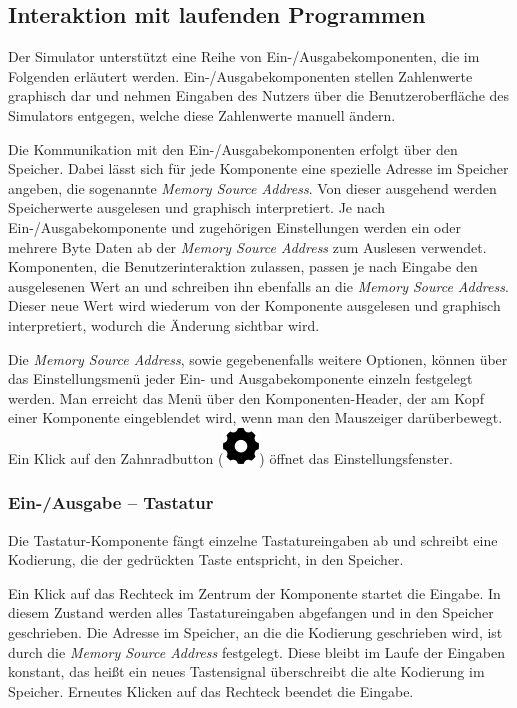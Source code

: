 \subsection{Interaktion mit laufenden Programmen}

Der Simulator unterstützt eine Reihe von Ein-/Ausgabekomponenten, die im
Folgenden erläutert werden. Ein-/Ausgabekomponenten stellen Zahlenwerte
graphisch dar und nehmen Eingaben des Nutzers über die Benutzeroberfläche des
Simulators entgegen, welche diese Zahlenwerte manuell ändern.

Die Kommunikation mit den Ein-/Ausgabekomponenten erfolgt über den Speicher.
Dabei lässt sich für jede Komponente eine spezielle Adresse im Speicher angeben,
die sogenannte \textit{Memory Source Address}. Von dieser ausgehend werden
Speicherwerte ausgelesen und graphisch interpretiert. Je nach
Ein-/Ausgabekomponente und zugehörigen Einstellungen werden ein oder mehrere
Byte Daten ab der \textit{Memory Source Address} zum Auslesen verwendet.
Komponenten, die Benutzerinteraktion zulassen, passen je nach Eingabe den
ausgelesenen Wert an und schreiben ihn ebenfalls an die \textit{Memory Source
Address}. Dieser neue Wert wird wiederum von der Komponente ausgelesen und
graphisch interpretiert, wodurch die Änderung sichtbar wird.

Die \textit{Memory Source Address}, sowie gegebenenfalls weitere Optionen, können
über das Einstellungsmenü jeder Ein- und Ausgabekomponente einzeln festgelegt
werden. Man erreicht das Menü über den Komponenten-Header, der am Kopf einer
Komponente eingeblendet wird, wenn man den Mauszeiger darüberbewegt. Ein Klick
auf den Zahnradbutton (\includegraphics[scale=0.22]{Images/SettingsIcon}) öffnet
das Einstellungsfenster.

\subsubsection{Ein-/Ausgabe -- Tastatur}

Die Tastatur-Komponente fängt einzelne Tastatureingaben ab und schreibt eine
Kodierung, die der gedrückten Taste entspricht, in den Speicher.

Ein Klick auf das Rechteck im Zentrum der Komponente startet die Eingabe. In
diesem Zustand werden alles Tastatureingaben abgefangen und in den Speicher
geschrieben. Die Adresse im Speicher, an die die Kodierung geschrieben wird, ist
durch die \textit{Memory Source Address} festgelegt. Diese bleibt im Laufe der
Eingaben konstant, das heißt ein neues Tastensignal überschreibt die alte
Kodierung im Speicher. Erneutes Klicken auf das Rechteck beendet die Eingabe.

